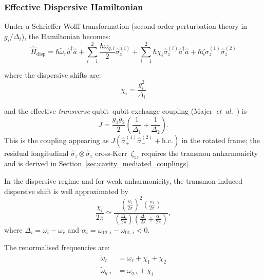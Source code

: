 \subsubsection{Effective Dispersive Hamiltonian}

Under a Schrieffer-Wolff transformation (second-order perturbation theory in $g_i/\Delta_i$), the Hamiltonian becomes:
\begin{equation}
\hat{H}_{\text{disp}} = \hbar\tilde{\omega}_r \hat{a}^\dagger\hat{a} + \sum_{i=1}^{2} \frac{\hbar\tilde{\omega}_{q,i}}{2}\hat{\sigma}_z^{(i)} + \sum_{i=1}^{2} \hbar\chi_i \hat{\sigma}_z^{(i)} \hat{a}^\dagger\hat{a} + \hbar\zeta \hat{\sigma}_z^{(1)}\hat{\sigma}_z^{(2)}
\label{eq:dispersive_hamiltonian}
\end{equation}

where the dispersive shifts are:
\begin{equation}
\chi_i = \frac{g_i^2}{\Delta_i}
\end{equation}

and the effective \emph{transverse} qubit--qubit exchange coupling
(Majer~\textit{et~al.}~\cite{Majer2007}) is
\begin{equation}
J = \frac{g_1 g_2}{2}\left(\frac{1}{\Delta_1} + \frac{1}{\Delta_2}\right) .
\label{eq:J_dispersive}
\end{equation}
This is the coupling appearing as $J(\hat{\sigma}_+^{(1)}\hat{\sigma}_-^{(2)}
+ \mathrm{h.c.})$ in the rotated frame; the residual longitudinal
$\hat{\sigma}_z\!\otimes\!\hat{\sigma}_z$ cross-Kerr~$\zeta_{zz}$ requires
the transmon anharmonicity and is derived in
Section~\ref{sec:cavity_mediated_couplings}.

In the dispersive regime and for weak anharmonicity, the transmon-induced dispersive shift is well
approximated by
\begin{equation}
\frac{\chi_i}{2\pi}\simeq
\frac{\left(\frac{g_i}{2\pi}\right)^2 \left(\frac{\alpha_i}{2\pi}\right)}
{\left(\frac{\Delta_i}{2\pi}\right)\left(\frac{\Delta_i}{2\pi}+\frac{\alpha_i}{2\pi}\right)} ,
\label{eq:chi_transmon}
\end{equation}
where \(\Delta_i = \omega_i-\omega_r\) and \(\alpha_i=\omega_{12,i}-\omega_{01,i}<0\).

The renormalised frequencies are:
\begin{align}
\tilde{\omega}_r &= \omega_r + \chi_1 + \chi_2 \\
\tilde{\omega}_{q,i} &= \omega_{q,i} + \chi_i
\end{align}

